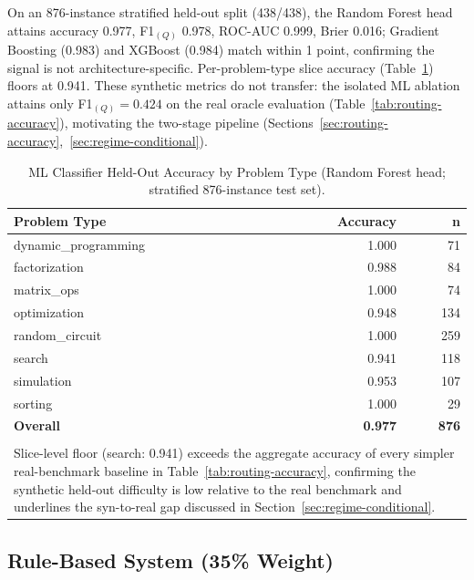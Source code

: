 \documentclass[10pt,conference]{IEEEtran}
\begin{document}
On an 876-instance stratified held-out split (438/438), the Random Forest head attains accuracy 0.977, F1$_{(Q)}$ 0.978, ROC-AUC 0.999, Brier 0.016; Gradient Boosting (0.983) and XGBoost (0.984) match within 1 point, confirming the signal is not architecture-specific. Per-problem-type slice accuracy (Table~\ref{tab:ml-slice-metrics}) floors at 0.941. These synthetic metrics do not transfer: the isolated ML ablation attains only F1$_{(Q)}{=}0.424$ on the real oracle evaluation (Table~\ref{tab:routing-accuracy}), motivating the two-stage pipeline (Sections~\ref{sec:routing-accuracy},~\ref{sec:regime-conditional}).

\begin{table}[htbp]
\caption{ML Classifier Held-Out Accuracy by Problem Type (Random Forest head; stratified 876-instance test set).}
\label{tab:ml-slice-metrics}
\centering
\footnotesize
\setlength{\tabcolsep}{6pt}
\begin{tabular}{l r r}
\toprule
\textbf{Problem Type} & \textbf{Accuracy} & \textbf{n} \\
\midrule
dynamic\_programming & 1.000 & 71  \\
factorization        & 0.988 & 84  \\
matrix\_ops          & 1.000 & 74  \\
optimization         & 0.948 & 134 \\
random\_circuit      & 1.000 & 259 \\
search               & 0.941 & 118 \\
simulation           & 0.953 & 107 \\
sorting              & 1.000 & 29  \\
\midrule
\textbf{Overall}     & \textbf{0.977} & \textbf{876} \\
\bottomrule
\\[-0.5em]
\multicolumn{3}{p{0.82\columnwidth}}{\footnotesize Slice-level floor (search: 0.941) exceeds the aggregate accuracy of every simpler real-benchmark baseline in Table~\ref{tab:routing-accuracy}, confirming the synthetic held-out difficulty is low relative to the real benchmark and underlines the syn-to-real gap discussed in Section~\ref{sec:regime-conditional}.} \\
\end{tabular}
\end{table}

\subsection{Rule-Based System (35\% Weight)}
\end{document}

